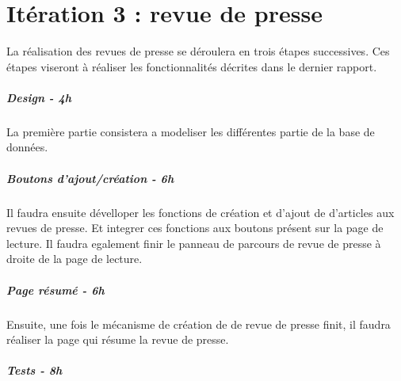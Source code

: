 \section{Itération 3 : revue de presse}
\label{sec:revue}

La réalisation des revues de presse se déroulera en trois étapes successives.
Ces étapes viseront à réaliser les fonctionnalités décrites dans le dernier rapport.

\subparagraph{Design - 4h}
\label{subpar:revue_design}
La première partie consistera a modeliser les différentes partie de la base de données.

\subparagraph{Boutons d'ajout/création - 6h}
\label{subpar:revue_design}
Il faudra ensuite dévelloper les fonctions de création et d'ajout de d'articles aux revues de presse.
Et integrer ces fonctions aux boutons présent sur la page de lecture.
Il faudra egalement finir le panneau de parcours de revue de presse à droite de la page de lecture.

\subparagraph{Page résumé - 6h}
\label{subpar:revue_resume}
Ensuite, une fois le mécanisme de création de de revue de presse finit, il faudra réaliser la page qui résume
la revue de presse.

\subparagraph{Tests - 8h}
\label{subpar:revue_tests}
